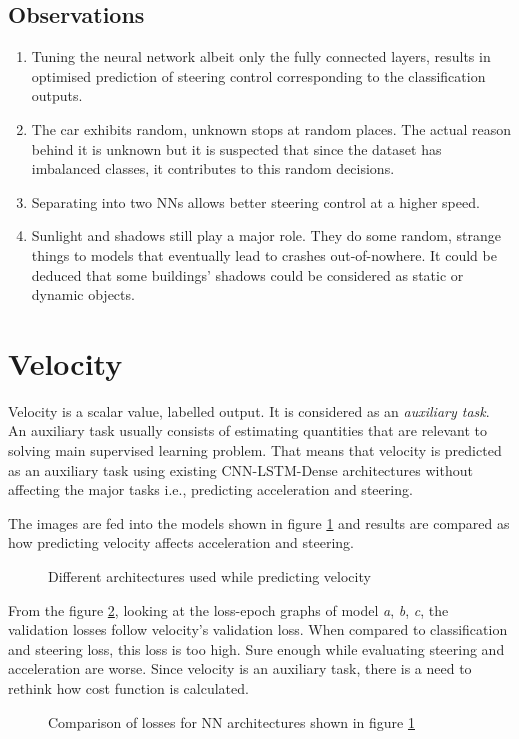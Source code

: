 \subsection{Observations}
\begin{enumerate}
    \item Tuning the neural network albeit only the fully connected layers, results in
        optimised prediction of steering control corresponding to the classification
        outputs.
    \item The car exhibits random, unknown stops at random places. The actual reason
        behind it is unknown but it is suspected that since the dataset has imbalanced
        classes, it contributes to this random decisions.
    \item Separating into two NNs allows better steering control at a higher speed.
    \item Sunlight and shadows still play a major role. They do some random, strange
        things to models that eventually lead to crashes out-of-nowhere. It could be
        deduced that some buildings' shadows could be considered as static or dynamic
        objects.
\end{enumerate}
\section{Velocity}
Velocity is a scalar value, labelled output. It is considered as an \textit{auxiliary
task}. An auxiliary task usually consists of estimating quantities that are relevant to
solving main supervised learning problem. That means that velocity is predicted as an
auxiliary task using existing CNN-LSTM-Dense architectures without affecting the major
tasks i.e., predicting acceleration and steering.

The images are fed into the models shown in figure \ref{fig:velocitycompareNN} and results are
compared as how predicting velocity affects acceleration and steering.
\begin{figure}[!ht]
    \def\svgwidth{1.15\textwidth}
    \caption{Different architectures used while predicting velocity}
    \label{fig:velocitycompareNN}
\end{figure}

From the figure \ref{fig:velocitycompareloss1}, looking at the loss-epoch graphs of model
\textit{a}, \textit{b}, \textit{c}, the validation losses follow velocity's validation loss.
When compared to classification and steering loss, this loss is too high. Sure enough
while evaluating steering and acceleration are worse. Since velocity is an auxiliary task,
there is a need to rethink how cost function is calculated.
\begin{figure}[!ht]
	\centering
    \def\svgwidth{\textwidth}
    \caption{Comparison of losses for NN architectures shown in figure \ref{fig:velocitycompareNN}}
    \label{fig:velocitycompareloss1}
\end{figure}

